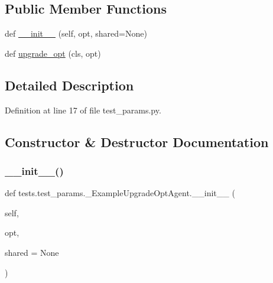 \subsection*{Public Member Functions}
\begin{DoxyCompactItemize}
\item 
def \hyperlink{classtests_1_1test__params_1_1__ExampleUpgradeOptAgent_acef7f1764706efba76b8f106e90b53cc}{\+\_\+\+\_\+init\+\_\+\+\_\+} (self, opt, shared=None)
\item 
def \hyperlink{classtests_1_1test__params_1_1__ExampleUpgradeOptAgent_ad842b65ef0ce493c7644622aae6e17dc}{upgrade\+\_\+opt} (cls, opt)
\end{DoxyCompactItemize}


\subsection{Detailed Description}


Definition at line 17 of file test\+\_\+params.\+py.



\subsection{Constructor \& Destructor Documentation}
\mbox{\label{classtests_1_1test__params_1_1__ExampleUpgradeOptAgent_acef7f1764706efba76b8f106e90b53cc}} 
\subsubsection{\texorpdfstring{\+\_\+\+\_\+init\+\_\+\+\_\+()}{\_\_init\_\_()}}
{\footnotesize\ttfamily def tests.\+test\+\_\+params.\+\_\+\+Example\+Upgrade\+Opt\+Agent.\+\_\+\+\_\+init\+\_\+\+\_\+ (\begin{DoxyParamCaption}\item[{}]{self,  }\item[{}]{opt,  }\item[{}]{shared = {\ttfamily None} }\end{DoxyParamCaption})}



